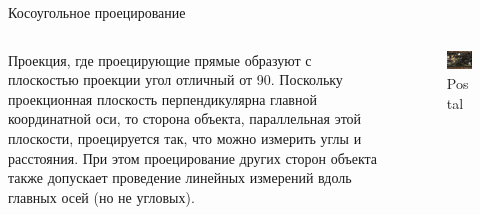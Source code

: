 \documentclass{beamer}
\begin{document}
	\begin{frame}{Косоугольное проецирование}
	\begin{columns}
		\begin{column}{0.45\textwidth}
			Проекция, где проецирующие прямые образуют с плоскостью проекции угол отличный от 90\textdegree.
			{ \scriptsize
			Поскольку проекционная плоскость перпендикулярна главной координатной оси, 
		то сторона объекта, параллельная этой плоскости, проецируется так, что можно измерить углы и расстояния. 
		При этом проецирование других сторон объекта также допускает проведение линейных измерений вдоль главных осей (но не угловых).
			}
		\end{column}
		\begin{column}{0.55\textwidth}
			\begin{figure} 
					\includegraphics[width=\textwidth]{images/postal.jpg}
				\caption{Postal}
			\end{figure}
		\end{column}
	\end{columns}
	\end{frame}
\end{document}
